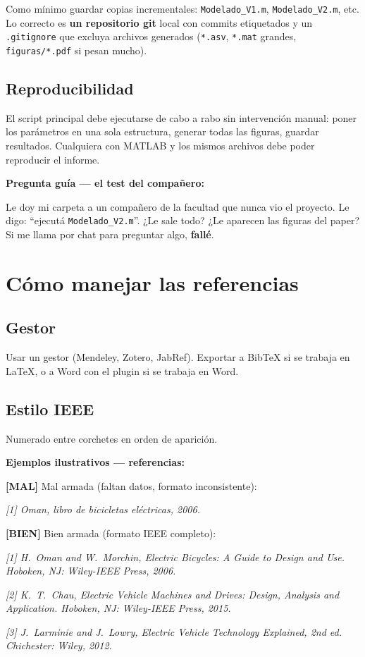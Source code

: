 \documentclass[11pt,a4paper]{article}
\newcommand{\malo}{\textcolor{red!70!black}{\textbf{[MAL]}}}
\newcommand{\bueno}{\textcolor{green!50!black}{\textbf{[BIEN]}}}
\begin{document}
Como mínimo guardar copias incrementales: \texttt{Modelado\_V1.m}, \texttt{Modelado\_V2.m}, etc. Lo correcto es \textbf{un repositorio git} local con commits etiquetados y un \texttt{.gitignore} que excluya archivos generados (\texttt{*.asv}, \texttt{*.mat} grandes, \texttt{figuras/*.pdf} si pesan mucho).

\subsection{Reproducibilidad}

El script principal debe ejecutarse de cabo a rabo sin intervención manual: poner los parámetros en una sola estructura, generar todas las figuras, guardar resultados. Cualquiera con MATLAB y los mismos archivos debe poder reproducir el informe.

\begin{guia}
\textbf{Pregunta guía --- el test del compañero:}

Le doy mi carpeta a un compañero de la facultad que nunca vio el proyecto. Le digo: ``ejecutá \texttt{Modelado\_V2.m}''. ¿Le sale todo? ¿Le aparecen las figuras del paper? Si me llama por chat para preguntar algo, \textbf{fallé}.
\end{guia}

\hrulefill

\section{Cómo manejar las referencias}

\subsection{Gestor}

Usar un gestor (Mendeley, Zotero, JabRef). Exportar a BibTeX si se trabaja en LaTeX, o a Word con el plugin si se trabaja en Word.

\subsection{Estilo IEEE}

Numerado entre corchetes en orden de aparición.

\begin{ejemplo}
\textbf{Ejemplos ilustrativos --- referencias:}

\malo{} Mal armada (faltan datos, formato inconsistente):

\textit{[1] Oman, libro de bicicletas eléctricas, 2006.}

\bueno{} Bien armada (formato IEEE completo):

\textit{[1] H.~Oman and W.~Morchin, \textit{Electric Bicycles: A Guide to Design and Use}. Hoboken, NJ: Wiley-IEEE Press, 2006.}

\textit{[2] K.~T.~Chau, \textit{Electric Vehicle Machines and Drives: Design, Analysis and Application}. Hoboken, NJ: Wiley-IEEE Press, 2015.}

\textit{[3] J.~Larminie and J.~Lowry, \textit{Electric Vehicle Technology Explained}, 2nd ed. Chichester: Wiley, 2012.}
\end{ejemplo}
\end{document}
